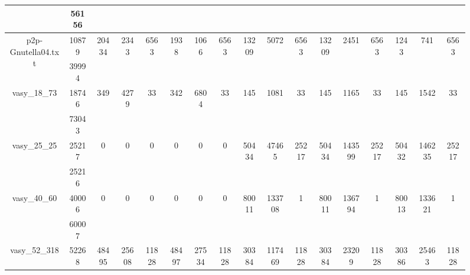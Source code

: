\documentclass[../master/master.tex]{subfiles}
\begin{document}
\begin{figure}
\begin{adjustbox}{angle=90}
\begin{tabular}{ |c|c||c|c|c||c|c|c||c|c|c||c|c|c||c|c|c| }
\cline{2-2}
 & 56156  &  &  &  &  &  &  &  &  &  &  &  &  &  &  &  \\
\hline
\multirow{2}{3.6em}{p2p-Gnutella04.txt} & 10879 & \multirow{2}{3.6em}{20434} & \multirow{2}{3.6em}{2343 } & \multirow{2}{3.6em}{6563} & \multirow{2}{3.6em}{1938} & \multirow{2}{3.6em}{1066 } & \multirow{2}{3.6em}{6563} & \multirow{2}{3.6em}{13209} & \multirow{2}{3.6em}{5072 } & \multirow{2}{3.6em}{6563} & \multirow{2}{3.6em}{13209} & \multirow{2}{3.6em}{2451 } & \multirow{2}{3.6em}{6563} & \multirow{2}{3.6em}{1243} & \multirow{2}{3.6em}{741 } & \multirow{2}{3.6em}{6563} \\
\cline{2-2}
 & 39994  &  &  &  &  &  &  &  &  &  &  &  &  &  &  &  \\
\hline
\multirow{2}{3.6em}{vasy\_18\_73} & 18746 & \multirow{2}{3.6em}{349} & \multirow{2}{3.6em}{4279 } & \multirow{2}{3.6em}{33} & \multirow{2}{3.6em}{342} & \multirow{2}{3.6em}{6804 } & \multirow{2}{3.6em}{33} & \multirow{2}{3.6em}{145} & \multirow{2}{3.6em}{1081 } & \multirow{2}{3.6em}{33} & \multirow{2}{3.6em}{145} & \multirow{2}{3.6em}{1165 } & \multirow{2}{3.6em}{33} & \multirow{2}{3.6em}{145} & \multirow{2}{3.6em}{1542 } & \multirow{2}{3.6em}{33} \\
\cline{2-2}
 & 73043  &  &  &  &  &  &  &  &  &  &  &  &  &  &  &  \\
\hline
\multirow{2}{3.6em}{vasy\_25\_25} & 25217 & \multirow{2}{3.6em}{0} & \multirow{2}{3.6em}{0 } & \multirow{2}{3.6em}{0} & \multirow{2}{3.6em}{0} & \multirow{2}{3.6em}{0 } & \multirow{2}{3.6em}{0} & \multirow{2}{3.6em}{50434} & \multirow{2}{3.6em}{47465 } & \multirow{2}{3.6em}{25217} & \multirow{2}{3.6em}{50434} & \multirow{2}{3.6em}{143599 } & \multirow{2}{3.6em}{25217} & \multirow{2}{3.6em}{50432} & \multirow{2}{3.6em}{146235 } & \multirow{2}{3.6em}{25217} \\
\cline{2-2}
 & 25216  &  &  &  &  &  &  &  &  &  &  &  &  &  &  &  \\
\hline
\multirow{2}{3.6em}{vasy\_40\_60} & 40006 & \multirow{2}{3.6em}{0} & \multirow{2}{3.6em}{0 } & \multirow{2}{3.6em}{0} & \multirow{2}{3.6em}{0} & \multirow{2}{3.6em}{0 } & \multirow{2}{3.6em}{0} & \multirow{2}{3.6em}{80011} & \multirow{2}{3.6em}{133708 } & \multirow{2}{3.6em}{1} & \multirow{2}{3.6em}{80011} & \multirow{2}{3.6em}{136794 } & \multirow{2}{3.6em}{1} & \multirow{2}{3.6em}{80013} & \multirow{2}{3.6em}{133621 } & \multirow{2}{3.6em}{1} \\
\cline{2-2}
 & 60007  &  &  &  &  &  &  &  &  &  &  &  &  &  &  &  \\
\hline
\multirow{2}{3.6em}{vasy\_52\_318} & 52268 & \multirow{2}{3.6em}{48495} & \multirow{2}{3.6em}{25608 } & \multirow{2}{3.6em}{11828} & \multirow{2}{3.6em}{48497} & \multirow{2}{3.6em}{27534 } & \multirow{2}{3.6em}{11828} & \multirow{2}{3.6em}{30384} & \multirow{2}{3.6em}{117469 } & \multirow{2}{3.6em}{11828} & \multirow{2}{3.6em}{30384} & \multirow{2}{3.6em}{23209 } & \multirow{2}{3.6em}{11828} & \multirow{2}{3.6em}{30386} & \multirow{2}{3.6em}{25463 } & \multirow{2}{3.6em}{11828} \\

\end{tabular}
\end{adjustbox}
\end{figure}
\end{document}
